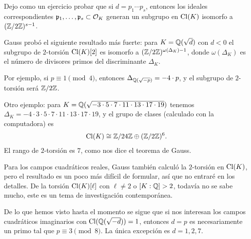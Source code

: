 Dejo como un ejercicio probar que si $d = p_1\cdots p_s$, entonces los ideales
correspondientes $\mathfrak{p}_1,\ldots,\mathfrak{p}_s \subset \mathcal{O}_K$ generan
un subgrupo en $\operatorname{Cl} (K)$ isomorfo a $(\mathbb{Z}/2\mathbb{Z})^{s-1}$.

\begin{comentario}
  Gauss probó el siguiente resultado más fuerte: para $K = \mathbb{Q} (\sqrt{d})$
  con $d < 0$ el subgrupo de $2$-torsión $\operatorname{Cl} (K)[2]$ es isomorfo a
  $(\mathbb{Z}/2\mathbb{Z})^{\omega (\Delta_K) - 1}$, donde $\omega (\Delta_K)$ es el número
  de divisores primos del discriminante $\Delta_K$.

  Por ejemplo, si $p \equiv 1 \pmod{4}$, entonces
  $\Delta_{\mathbb{Q} (\sqrt{-p})} = -4\cdot p$, y el subgrupo de $2$-torsión será
  $\mathbb{Z}/2\mathbb{Z}$.

  Otro ejemplo: para
  $K = \mathbb{Q} (\sqrt{-3\cdot 5\cdot 7\cdot 11\cdot 13\cdot 17\cdot 19})$
  tenemos
  $\Delta_K = -4\cdot 3\cdot 5\cdot 7\cdot 11\cdot 13\cdot 17\cdot 19$,
  y el grupo de clases (calculado con la computadora) es
  $$\operatorname{Cl} (K) \cong \mathbb{Z}/24\mathbb{Z} \oplus (\mathbb{Z}/2\mathbb{Z})^6.$$
  El rango de $2$-torsión es $7$, como nos dice el teorema de Gauss.

  Para los campos cuadráticos reales, Gauss también calculó la $2$-torsión en
  $\operatorname{Cl} (K)$, pero el resultado es un poco más difícil de formular, así que no
  entraré en los detalles. De la torsión $\operatorname{Cl} (K) [\ell]$ con $\ell \ne 2$
  o $[K : \mathbb{Q}] > 2$, todavía no se sabe mucho, este es un tema de investigación
  contemporánea.
\end{comentario}

De lo que hemos visto hasta el momento se sigue que si nos interesan los campos
cuadráticos imaginarios con $\operatorname{Cl} (\mathbb{Q}(\sqrt{-d})) = 1$, entonces $d = p$ es
necesariamente un primo tal que $p \equiv 3 \pmod{8}$. La única excepción es
$d = 1,2,7$.

